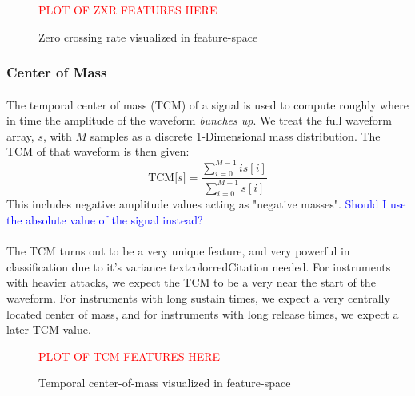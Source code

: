 \documentclass[12pt,letterpaper]{article}
\begin{document}
\begin{figure}[H]
\begin{center}
\textcolor{red}{PLOT OF ZXR FEATURES HERE}
\end{center}
\caption{Zero crossing rate visualized in feature-space}
\label{fig-FeatureZXR}
\end{figure}


\subsubsection{Center of Mass}

\paragraph*{}The temporal center of mass (TCM) of a signal is used to compute roughly where in time the amplitude of the waveform \textit{bunches up}. We treat the full waveform array, $s$, with $M$ samples as a discrete 1-Dimensional mass distribution. The TCM of that waveform is then given:
\begin{equation}
\label{eqn-FeatureTCM}
\text{TCM}\big[ s \big] = \frac{\sum_{i=0}^{M-1}i s[i]}{\sum_{i=0}^{M-1}s[i]}
\end{equation}
This includes negative amplitude values acting as "negative masses". \textcolor{blue}{Should I use the absolute value of the signal instead?}

\paragraph*{}The TCM turns out to be a very unique feature, and very powerful in classification due to it's variance textcolor{red}{Citation needed}. For instruments with heavier attacks, we expect the TCM to be a very near the start of the waveform. For instruments with long sustain times, we expect a very centrally located center of mass, and for instruments with long release times, we expect a later TCM value.

\begin{figure}[H]
\begin{center}
\textcolor{red}{PLOT OF TCM FEATURES HERE}
\end{center}
\caption{Temporal center-of-mass visualized in feature-space}
\label{fig-FeatureTCM}
\end{figure}

\end{document}
